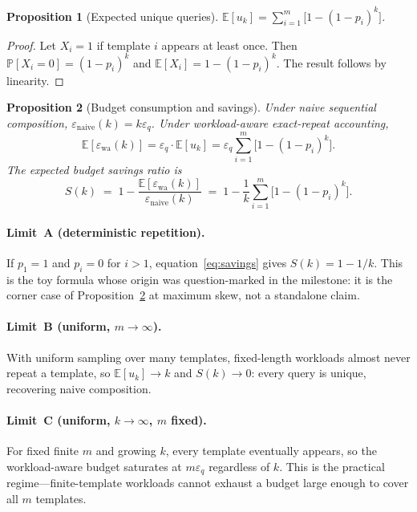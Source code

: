 \documentclass[sigconf,nonacm]{acmart}
\newcommand{\eps}{\varepsilon}
\newcommand{\E}{\mathbb{E}}
\newcommand{\Prob}{\mathbb{P}}
\newtheorem{prop}{Proposition}
\begin{document}
\begin{prop}[Expected unique queries]
\label{prop:eu}
$\E[u_k] = \sum_{i=1}^m \bigl[1 - (1-p_i)^k\bigr]$.
\end{prop}
\begin{proof}
Let $X_i = 1$ if template $i$ appears at least once. Then $\Prob[X_i=0]=(1-p_i)^k$ and $\E[X_i]=1-(1-p_i)^k$. The result follows by linearity.
\end{proof}

\begin{prop}[Budget consumption and savings]
\label{prop:savings}
Under naive sequential composition, $\eps_{\mathrm{naive}}(k) = k\eps_q$. Under workload-aware exact-repeat accounting,
\[
\E[\eps_{\mathrm{wa}}(k)] = \eps_q \cdot \E[u_k] = \eps_q \sum_{i=1}^m \bigl[1-(1-p_i)^k\bigr].
\]
The expected budget savings ratio is
\begin{equation}
S(k) \;=\; 1 - \frac{\E[\eps_{\mathrm{wa}}(k)]}{\eps_{\mathrm{naive}}(k)}
\;=\; 1 - \frac{1}{k}\sum_{i=1}^m \bigl[1-(1-p_i)^k\bigr].
\label{eq:savings}
\end{equation}
\end{prop}

\paragraph{Limit~A (deterministic repetition).}
If $p_1 = 1$ and $p_i = 0$ for $i>1$, equation~\eqref{eq:savings} gives $S(k) = 1 - 1/k$. This is the toy formula whose origin was question-marked in the milestone: it is the corner case of Proposition~\ref{prop:savings} at maximum skew, not a standalone claim.

\paragraph{Limit~B (uniform, $m\to\infty$).}
With uniform sampling over many templates, fixed-length workloads almost never repeat a template, so $\E[u_k]\to k$ and $S(k)\to 0$: every query is unique, recovering naive composition.

\paragraph{Limit~C (uniform, $k\to\infty$, $m$ fixed).}
For fixed finite $m$ and growing $k$, every template eventually appears, so the workload-aware budget saturates at $m\eps_q$ regardless of $k$. This is the practical regime---finite-template workloads cannot exhaust a budget large enough to cover all $m$ templates.
\end{document}
